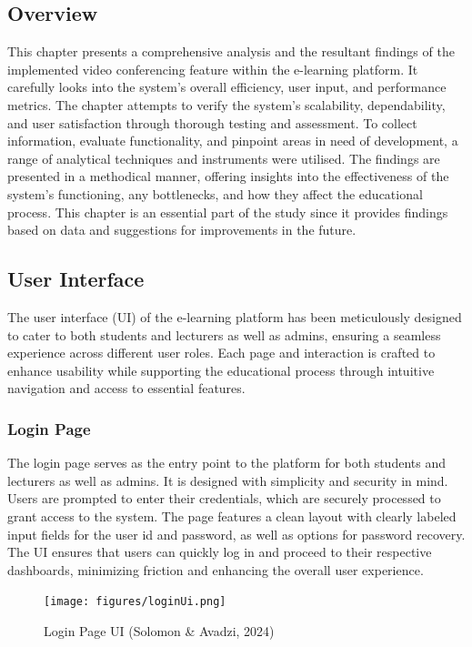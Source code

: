 \documentclass[a4paper,12pt]{article}  %
\begin{document}
\subsection{Overview}
This chapter presents a comprehensive analysis and the resultant findings of the implemented video conferencing feature within the e-learning platform. It carefully looks into the system's overall efficiency, user input, and performance metrics. The chapter attempts to verify the system's scalability, dependability, and user satisfaction through thorough testing and assessment. To collect information, evaluate functionality, and pinpoint areas in need of development, a range of analytical techniques and instruments were utilised. The findings are presented in a methodical manner, offering insights into the effectiveness of the system's functioning, any bottlenecks, and how they affect the educational process. This chapter is an essential part of the study since it provides findings based on data and suggestions for improvements in the future.\\

\subsection{User Interface}
The user interface (UI) of the e-learning platform has been meticulously designed to cater to both students and lecturers as well as admins, ensuring a seamless experience across different user roles. Each page and interaction is crafted to enhance usability while supporting the educational process through intuitive navigation and access to essential features.\\

\subsubsection{Login Page}
The login page serves as the entry point to the platform for both students and lecturers as well as admins. It is designed with simplicity and security in mind. Users are prompted to enter their credentials, which are securely processed to grant access to the system. The page features a clean layout with clearly labeled input fields for the user id and password, as well as options for password recovery. The UI ensures that users can quickly log in and proceed to their respective dashboards, minimizing friction and enhancing the overall user experience.\\

\begin{figure}[H]
      \centering
      \texttt{[image: figures/loginUi.png]}
      \caption{Login Page UI (Solomon \& Avadzi, 2024)}
\end{figure}
\end{document}
